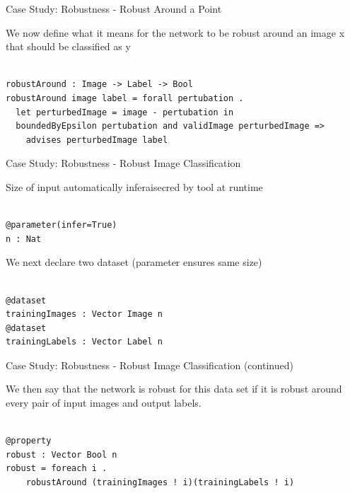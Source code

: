 \documentclass[t,compress,aspectratio=169]{beamer}
\begin{document}
\begin{frame}[fragile]{Case Study: Robustness - Robust Around a Point}

We now define what it means for the network to be robust around an image x that should be classified as y

\begin{verbatim}

robustAround : Image -> Label -> Bool
robustAround image label = forall pertubation .
  let perturbedImage = image - pertubation in
  boundedByEpsilon pertubation and validImage perturbedImage =>
    advises perturbedImage label

\end{verbatim}



\end{frame}

\begin{frame}[fragile]{Case Study: Robustness - Robust Image Classification}

Size of input automatically inferaisecred by tool at runtime
\begin{verbatim}

@parameter(infer=True)
n : Nat

\end{verbatim}

We next declare two dataset (parameter ensures same size)

\begin{verbatim}

@dataset
trainingImages : Vector Image n
@dataset
trainingLabels : Vector Label n
\end{verbatim}
\end{frame}

\begin{frame}[fragile]{Case Study: Robustness - Robust Image Classification (continued)}

We then say that the network is robust for this data set if it is robust around every pair of input images and output labels. 

\begin{verbatim}

@property
robust : Vector Bool n
robust = foreach i . 
    robustAround (trainingImages ! i)(trainingLabels ! i)
\end{verbatim}



\end{frame}
\end{document}
